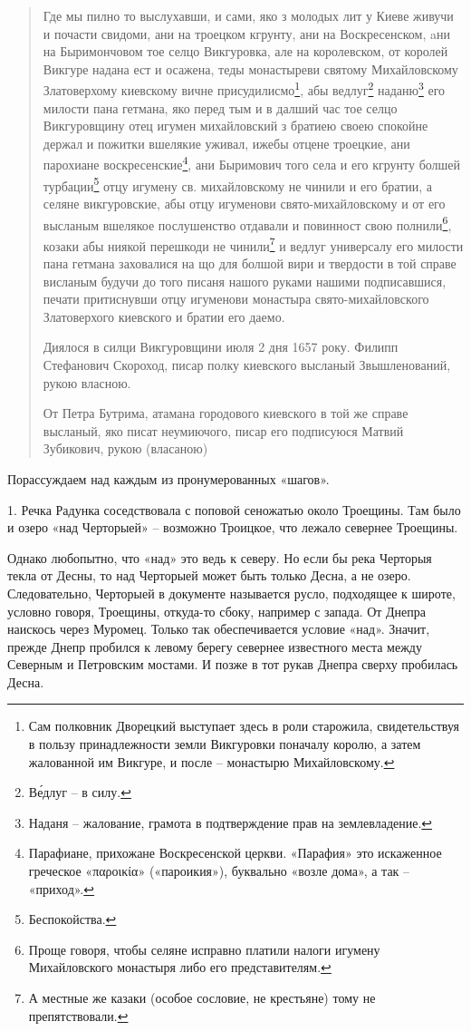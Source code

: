 \begin{quotation}
Где мы пилно то выслухавши, и сами, яко з молодых лит у Киеве живучи и почасти свидоми, ани на троецком кгрунту, ани на Воскресенском, aни на Быримончовом тое селцо Викгуровка, але на королевском, от королей Викгуре надана ест и осажена, теды монастыреви святому Михайловскому Златоверхому киевскому вичне присудилисмо\footnote{Сам полковник Дворецкий выступает здесь в роли старожила, свидетельствуя в пользу принадлежности земли Викгуровки поначалу королю, а затем жалованной им Викгуре, и после – монастырю Михайловскому.}, абы ведлуг\footnote{В\'едлуг – в силу.} наданю\footnote{Наданя – жалование, грамота в подтверждение прав на землевладение.} его милости пана гетмана, яко перед тым и в далший час тое селцо Викгуровщину отец игумен михайловский з братиею своею спокойне держал и пожитки вшелякие уживал, ижебы отцене троецкие, ани парохиане воскресенские\footnote{Парафиане, прихожане Воскресенской церкви. «Парафия» это искаженное греческое «παροικία» («пароикия»), буквально «возле дома», а так – «приход».}, ани Быримович того села и его кгрунту болшей турбации\footnote{Беспокойства.} отцу игумену св. михайловскому не чинили и его братии, а селяне викгуровские, абы отцу игуменови свято-михайловскому и от его высланым вшелякое послушенство отдавали и повинност свою полнили\footnote{Проще говоря, чтобы селяне исправно платили налоги игумену Михайловского монастыря либо его представителям.}, козаки абы ниякой перешкоди не чинили\footnote{А местные же казаки (особое сословие, не крестьяне) тому не препятствовали.} и ведлуг универсалу его милости пана гетмана заховалися на що для болшой вири и твердости в той справе висланым будучи до того писаня нашого руками нашими подписавшися, печати притиснувши отцу игуменови монастыра свято-михайловского Златоверхого киевского и братии его даемо.

Диялося в силци Викгуровщини июля 2 дня 1657 року. Филипп Стефанович Скороход, писар полку киевского высланый Звышленований, рукою власною.

От Петра Бутрима, атамана городового киевского в той же справе высланый, яко писат неумиючого, писар его подписуюся Матвий Зубикович, рукою (власаною)
\end{quotation}

Порассуждаем над каждым из пронумерованных «шагов».

1. Речка Радунка соседствовала с поповой сеножатью около Троещины. Там было и озеро «над Черторыей» – возможно Троицкое, что лежало севернее Троещины.

Однако любопытно, что «над» это ведь к северу. Но если бы река Черторыя текла от Десны, то над Черторыей может быть только Десна, а не озеро. Следовательно, Черторыей в документе называется русло, подходящее к широте, условно говоря, Троещины, откуда-то сбоку, например с запада. От Днепра наискось через Муромец. Только так обеспечивается условие «над». Значит, прежде Днепр пробился к левому берегу севернее известного места между Северным и Петровским мостами. И позже в тот рукав Днепра сверху пробилась Десна.

